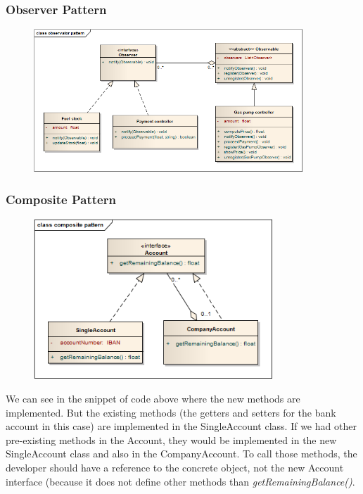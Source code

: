 \subsubsection{Observer Pattern}
\begin{figure}[H]
 \centering
 \includegraphics[width=0.9\textwidth]{../observatorPattern.png}
\end{figure}




\subsubsection{Composite Pattern}
\begin{figure}[H]
 \centering
 \includegraphics[width=0.8\textwidth]{../compositePattern.png}
\end{figure}



We can see in the snippet of code above where the new methods are implemented.
But the existing methods (the getters and setters for the bank account in this case) are implemented in the SingleAccount class. If we had other pre-existing methods in the Account, they would be implemented in the new SingleAccount class and also in the CompanyAccount. To call those methods, the developer should have a reference to the concrete object, not the new Account interface (because it does not define other methods than \textit{getRemainingBalance()}.
